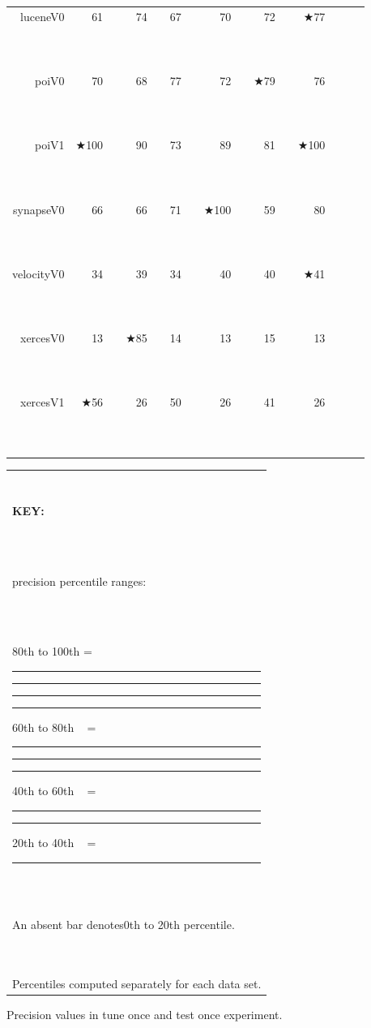 \documentclass{acm_proc_article-sp}
\newcommand{\crule}[3][darkgray]{\textcolor{#1}{\rule{#2}{#3}}}
\newcommand{\rone}{\crule{1mm}{1.95mm}}
\newcommand{\rtwo}{\crule{1mm}{1.95mm}\hspace{0.3pt}\crule{1mm}{1.95mm}}
\newcommand{\rthree}{\crule{1mm}{1.95mm}\hspace{0.3pt}\crule{1mm}{1.95mm}\hspace{0.3pt}\crule{1mm}{1.95mm}}
\newcommand{\rfour}{\crule{1mm}{1.95mm}\hspace{0.3pt}\crule{1mm}{1.95mm}\hspace{0.3pt}\crule{1mm}{1.95mm}\hspace{0.3pt}\crule{1mm}{1.95mm}}
\begin{document}
\begin{figure*}
\begin{minipage}{0.81\linewidth}
\begin{tabular}{r@{~}|r@{~}l@{~}|r@{~}l@{~}|r@{~}l|r@{~}@{~}l|r@{~}l@{~}|r@{~}l@{~}|r@{~}l}
luceneV0 & 61 &         & 74 & {\rfour} & 67 & {\rone} & 70 & {\rtwo} & 72 & {\rthree} & $\bigstar$77 & {\rfour}\\
poiV0 & 70 &         & 68 &         & 77 & {\rfour} & 72 & {\rone} & $\bigstar$79 & {\rfour} & 76 & {\rthree}\\
poiV1 & $\bigstar$100 & {\rfour} & 90 & {\rthree} & 73 &         & 89 & {\rtwo} & 81 & {\rone} & $\bigstar$100 & {\rfour}\\
synapseV0 & 66 &         & 66 &         & 71 & {\rone} & $\bigstar$100 & {\rfour} & 59 &         & 80 & {\rtwo}\\
velocityV0 & 34 &         & 39 & {\rthree} & 34 &         & 40 & {\rfour} & 40 & {\rfour} & $\bigstar$41 & {\rfour}\\
xercesV0 & 13 &         & $\bigstar$85 & {\rfour} & 14 &         & 13 &         & 15 &         & 13 &        \\
xercesV1 & $\bigstar$56 & {\rfour} & 26 &         & 50 & {\rthree} & 26 &         & 41 & {\rtwo} & 26 &        \\
\end{tabular}
\end{minipage}\begin{minipage}{.15\linewidth}
\begin{tabular}{|p{\linewidth}|}\hline

~\\

{\bf KEY:}

~\\

precision percentile ranges:

~\\

80th to 100th = {\rfour}

60th to 80th ~ = {\rthree}

40th to 60th  ~ = {\rtwo}

20th to 40th  ~ = {\rone}

~\\

An absent bar denotes\newline 0th to 20th percentile.

~\\

Percentiles computed  separately
for each data set.\\\hline
\end{tabular}
\end{minipage}
\caption{Precision values in tune once and test once experiment. 
}\label{fig:nonc}
\end{figure*}
\end{document}
